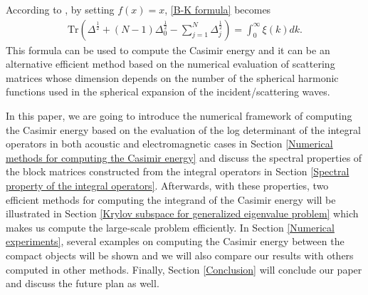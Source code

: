 According to \cite{hanisch2020relative}, by setting $f(x) = x$, \eqref{B-K formula} becomes 
\begin{align*}
    \text{Tr}\left(\Delta^{\frac{1}{2}} + (N - 1)\Delta_{0}^{\frac{1}{2}} - \sum_{j = 1}^{N}\Delta_{j}^{\frac{1}{2}}\right)  = \int_{0}^{\infty}\xi(k)dk.
\end{align*}
This formula can be used to compute the Casimir energy and it can be an alternative efficient method based on the numerical evaluation of scattering matrices
whose dimension depends on the number of the spherical harmonic functions used in the spherical expansion of the incident/scattering waves.

In this paper, we are going to introduce the numerical framework of computing the Casimir energy based on the evaluation of the log determinant of the integral 
operators in both acoustic and electromagnetic cases in Section \ref{Numerical methods for computing the Casimir energy} and discuss the spectral properties 
of the block matrices constructed from the integral operators in Section \ref{Spectral property of the integral operators}. Afterwards, with these properties, 
two efficient methods for computing the integrand of the Casimir energy will be illustrated in Section \ref{Krylov subspace for generalized eigenvalue problem}
which makes us compute the large-scale problem efficiently. In Section \ref{Numerical experiments}, several examples on computing the Casimir energy between 
the compact objects will be shown and we will also compare our results with others computed in other methods. Finally, Section \ref{Conclusion} will conclude 
our paper and discuss the future plan as well.